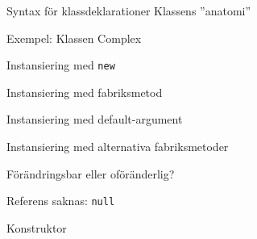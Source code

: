 \begin{Slide}{Syntax för klassdeklarationer}
Klassens ''anatomi''
\end{Slide}


\begin{Slide}{Exempel: Klassen Complex}\small
\end{Slide}



\begin{Slide}{Instansiering med \texttt{new}}
\end{Slide}

\begin{Slide}{Instansiering med fabriksmetod}
\end{Slide}

\begin{Slide}{Instansiering med default-argument}
\end{Slide}

\begin{Slide}{Instansiering med alternativa fabriksmetoder}
\end{Slide}

\begin{Slide}{Förändringsbar eller oföränderlig?}
\end{Slide}



\begin{Slide}{Referens saknas: \texttt{null}}
\end{Slide}


\begin{Slide}{Konstruktor}
\end{Slide}

